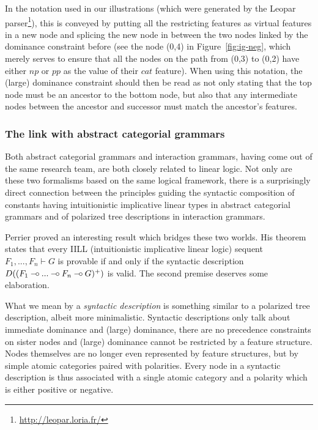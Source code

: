 In the notation used in our illustrations (which were generated by the
Leopar parser\footnote{\url{http://leopar.loria.fr/}}), this is conveyed
by putting all the restricting features as virtual features in a new
node and splicing the new node in between the two nodes linked by the
dominance constraint before (see the node (0,4) in
Figure~\ref{fig:ig-neg}, which merely serves to ensure that all the
nodes on the path from (0,3) to (0,2) have either $np$ or $pp$ as the
value of their $cat$ feature). When using this notation, the (large)
dominance constraint should then be read as not only stating that the
top node must be an ancestor to the bottom node, but also that any
intermediate nodes between the ancestor and successor must match the
ancestor's features.

\subsubsection{The link with abstract categorial grammars}
\label{sssec:link-ig-acg}

Both abstract categorial grammars and interaction grammars, having come
out of the same research team, are both closely related to linear
logic. Not only are these two formalisms based on the same logical
framework, there is a surprisingly direct connection between the
principles guiding the syntactic composition of constants having
intuitionistic implicative linear types in abstract categorial grammars
and of polarized tree descriptions in interaction grammars.

Perrier \cite{perrier1999intuitionistic} proved an interesting result
which bridges these two worlds. His theorem states that every IILL
(intuitionistic implicative linear logic) sequent $F_1, ..., F_n \vdash
G$ is provable if and only if the syntactic description $D((F_1 \mathbin{{-}\mkern-3.5mu{\circ}}
... \mathbin{{-}\mkern-3.5mu{\circ}} F_n \mathbin{{-}\mkern-3.5mu{\circ}} G)^+)$ is valid. The second premise deserves some
elaboration.

What we mean by a \emph{syntactic description} is something similar to a
polarized tree description, albeit more minimalistic. Syntactic
descriptions only talk about immediate dominance and (large) dominance,
there are no precedence constraints on sister nodes and (large)
dominance cannot be restricted by a feature structure. Nodes themselves
are no longer even represented by feature structures, but by simple
atomic categories paired with polarities. Every node in a syntactic
description is thus associated with a single atomic category and a
polarity which is either positive or negative.

